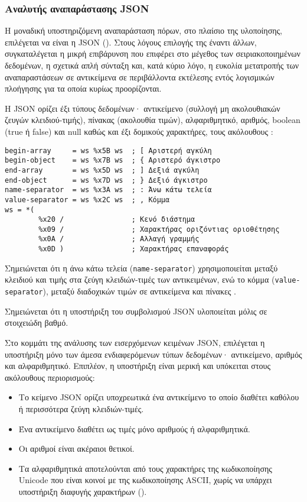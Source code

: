 \subsubsection{Αναλυτής αναπαράστασης JSON}

Η μοναδική υποστηριζόμενη αναπαράσταση πόρων, στο πλαίσιο της υλοποίησης,
επιλέγεται να είναι η JSON (). Στους λόγους
επιλογής της έναντι άλλων, συγκαταλέγεται η μικρή επιβάρυνση που επιφέρει στο
μέγεθος των σειριακοποιημένων δεδομένων, η σχετικά απλή σύνταξη και, κατά κύριο
λόγο, η ευκολία μετατροπής των αναπαραστάσεων σε αντικείμενα σε περιβάλλοντα
εκτέλεσης εντός λογισμικών πλοήγησης για τα οποία κυρίως προορίζονται.

Η JSON ορίζει έξι τύπους δεδομένων· αντικείμενο (συλλογή μη ακολουθιακών ζευγών
κλειδιού-τιμής), πίνακας (ακολουθία τιμών), αλφαριθμητικό, αριθμός, boolean
(true ή false) και null καθώς και έξι δομικούς χαρακτήρες, τους ακόλουθους
\parencite[3--5]{rfc7159}:
\begin{lstlisting}
begin-array     = ws %x5B ws  ; [ Αριστερή αγκύλη
begin-object    = ws %x7B ws  ; { Αριστερό άγκιστρο
end-array       = ws %x5D ws  ; ] Δεξιά αγκύλη
end-object      = ws %x7D ws  ; } Δεξιό άγκιστρο
name-separator  = ws %x3A ws  ; : Άνω κάτω τελεία
value-separator = ws %x2C ws  ; , Κόμμα
ws = *(
        %x20 /                ; Κενό διάστημα
        %x09 /                ; Χαρακτήρας οριζόντιας οριοθέτησης
        %x0A /                ; Αλλαγή γραμμής
        %x0D )                ; Χαρακτήρας επαναφοράς
\end{lstlisting}
Σημειώνεται ότι η άνω κάτω τελεία (\verb~name-separator~) χρησιμοποιείται μεταξύ
κλειδιού και τιμής στα ζεύγη κλειδιών-τιμές των αντικειμένων, ενώ το κόμμα
(\verb~value-separator~), μεταξύ διαδοχικών τιμών σε αντικείμενα και πίνακες
\parencite[6]{rfc7159}.


Σημειώνεται ότι η υποστήριξη του συμβολισμού JSON υλοποιείται μόλις σε
στοιχειώδη βαθμό.

Στο κομμάτι της ανάλυσης των εισερχόμενων κειμένων JSON, επιλέγεται η υποστήριξη
μόνο των άμεσα ενδιαφερόμενων τύπων δεδομένων· αντικείμενο, αριθμός και
αλφαριθμητικό. Επιπλέον, η υποστήριξη είναι μερική και υπόκειται στους
ακόλουθους περιορισμούς:
\begin{itemize}
    \item  Το κείμενο JSON ορίζει υποχρεωτικά ένα αντικείμενο το οποίο διαθέτει
    καθόλου ή περισσότερα ζεύγη κλειδιών-τιμές.

    \item Ένα αντικείμενο διαθέτει ως τιμές μόνο αριθμούς ή αλφαριθμητικά.

    \item Οι αριθμοί είναι ακέραιοι θετικοί.

    \item Τα αλφαριθμητικά αποτελούνται από τους χαρακτήρες της κωδικοποίησης
    Unicode που είναι κοινοί με της κωδικοποίησης ASCII, χωρίς να υπάρχει
    υποστήριξη διαφυγής χαρακτήρων ().
\end{itemize}

